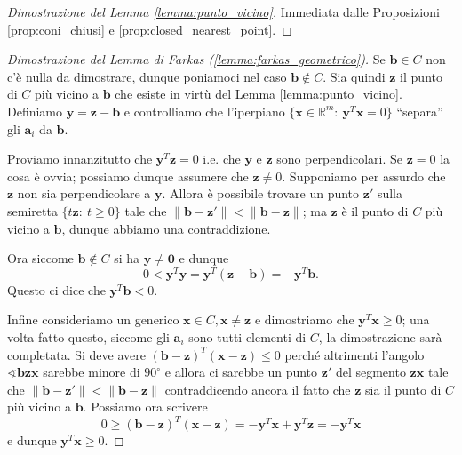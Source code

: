 \documentclass[italian, letter paper, 12pt, reqno]{article}
\theoremstyle{myteo}
\numberwithin{equation}{section}
\begin{document}
\begin{proof}[Dimostrazione del Lemma \ref{lemma:punto_vicino}]
  Immediata dalle Proposizioni \ref{prop:coni_chiusi} e \ref{prop:closed_nearest_point}.
\end{proof}

\begin{proof}[Dimostrazione del Lemma di Farkas (\ref{lemma:farkas_geometrico})]
  Se \(\mathbf{b}\in C\) non c'è nulla da dimostrare, dunque poniamoci nel caso \(\mathbf{b}\not\in C\).
  Sia quindi \(\mathbf{z}\) il punto di \(C\) più vicino a \(\mathbf{b}\) che esiste in virtù del Lemma \ref{lemma:punto_vicino}.
  Definiamo \(\mathbf{y} = \mathbf{z} - \mathbf{b}\) e controlliamo che l'iperpiano \(\big\{\mathbf{x}\in \mathbb{R}^m\colon\ \mathbf{y}^T \mathbf{x} = 0\big\}\) ``separa'' gli \(\mathbf{a}_i\) da \(\mathbf{b}\).

  Proviamo innanzitutto che \(\mathbf{y}^T \mathbf{z} = 0\) i.e. che \(\mathbf{y}\) e \(\mathbf{z}\) sono perpendicolari.
  Se \(\mathbf{z} = 0\) la cosa è ovvia; possiamo dunque assumere che \(\mathbf{z}\neq0\).
  Supponiamo per assurdo che \(\mathbf{z}\) non sia perpendicolare a \(\mathbf{y}\).
  Allora è possibile trovare un punto \(\mathbf{z}'\) sulla semiretta \(\big\{t \mathbf{z}\colon\ t \ge 0\big\}\) tale che \(\|\mathbf{b} - \mathbf{z}'\| < \|\mathbf{b} - \mathbf{z}\|\); ma \(\mathbf{z}\) è il punto di \(C\) più vicino a \(\mathbf{b}\), dunque abbiamo una contraddizione.

  Ora siccome \(\mathbf{b}\not\in C\) si ha \(\mathbf{y}\neq \mathbf{0}\) e dunque
  \begin{equation*}
    0 < \mathbf{y}^T \mathbf{y} = \mathbf{y}^T(\mathbf{z} - \mathbf{b}) = -\mathbf{y}^T \mathbf{b}.
  \end{equation*}
  Questo ci dice che \(\mathbf{y}^T \mathbf{b} < 0\).

  Infine consideriamo un generico \(\mathbf{x}\in C, \mathbf{x}\neq \mathbf{z}\) e dimostriamo che \(\mathbf{y}^T \mathbf{x} \ge 0\); una volta fatto questo, siccome gli \(\mathbf{a}_i\) sono tutti elementi di \(C\), la dimostrazione sarà completata.
  Si deve avere \((\mathbf{b} - \mathbf{z})^T(\mathbf{x} - \mathbf{z}) \le 0\) perché altrimenti l'angolo \(\sphericalangle \mathbf{b}\mathbf{z}\mathbf{x}\) sarebbe minore di \(90^\circ\) e allora ci sarebbe un punto \(\mathbf{z}'\) del segmento \(\mathbf{z}\mathbf{x}\) tale che \(\|\mathbf{b} - \mathbf{z}'\| < \|\mathbf{b} - \mathbf{z}\|\) contraddicendo ancora il fatto che \(\mathbf{z}\) sia il punto di \(C\) più vicino a \(\mathbf{b}\).
  Possiamo ora scrivere
  \begin{equation*}
    0 \ge (\mathbf{b} - \mathbf{z})^T(\mathbf{x} - \mathbf{z}) = -\mathbf{y}^T \mathbf{x} + \mathbf{y}^T \mathbf{z} = -\mathbf{y}^T \mathbf{x}
  \end{equation*}
  e dunque \(\mathbf{y}^T \mathbf{x} \ge 0\).
\end{proof}
\end{document}
